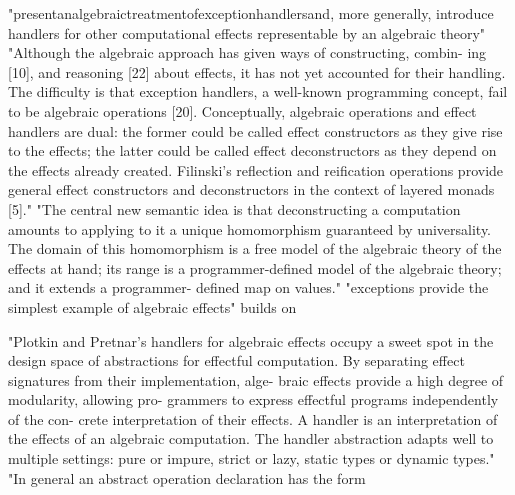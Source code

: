 "presentanalgebraictreatmentofexceptionhandlersand, more generally, introduce handlers for other computational effects representable by an algebraic theory"
"Although the algebraic approach has given ways of constructing, combin- ing [10], and reasoning [22] about effects, it has not yet accounted for their handling. The difficulty is that exception handlers, a well-known programming concept, fail to be algebraic operations [20]. Conceptually, algebraic operations and effect handlers are dual: the former could be called effect constructors as they give rise to the effects; the latter could be called effect deconstructors as they depend on the effects already created. Filinski’s reflection and reification operations provide general effect constructors and deconstructors in the context of layered monads [5]."
"The central new semantic idea is that deconstructing a computation amounts to applying to it a unique homomorphism guaranteed by universality. The domain of this homomorphism is a free model of the algebraic theory of the effects at hand; its range is a programmer-defined model of the algebraic theory; and it extends a programmer- defined map on values."
"exceptions provide the simplest example of algebraic effects"
\cite{Plotkin:2009dr}
builds on
\cite{benton2001exceptional}


"Plotkin and Pretnar’s handlers for algebraic effects occupy a sweet spot in the design space of abstractions for effectful computation. By separating effect signatures from their implementation, alge- braic effects provide a high degree of modularity, allowing pro- grammers to express effectful programs independently of the con- crete interpretation of their effects. A handler is an interpretation of the effects of an algebraic computation. The handler abstraction adapts well to multiple settings: pure or impure, strict or lazy, static types or dynamic types."
"In general an abstract operation declaration has the form
\cite{kammar2013handlers}

